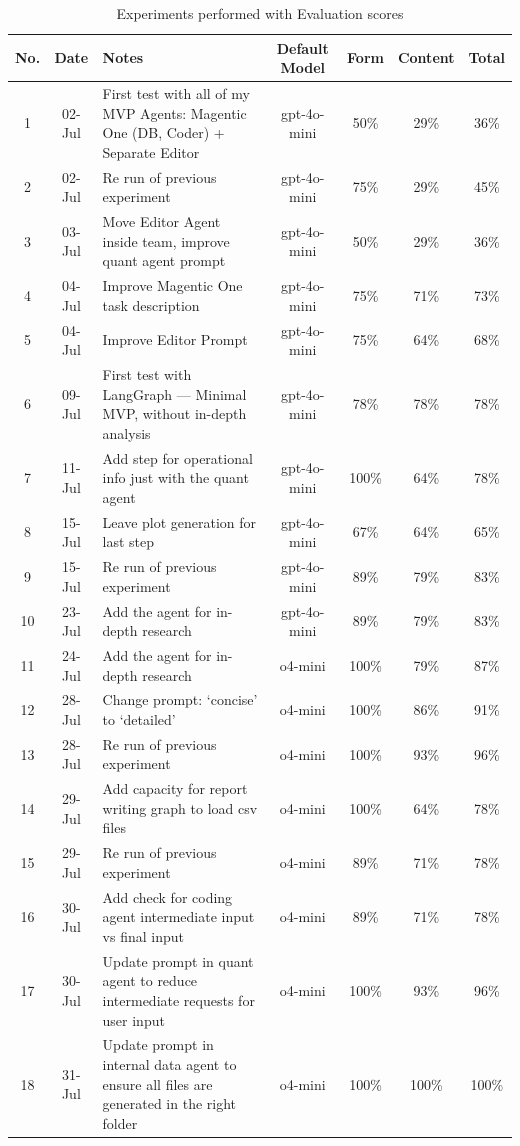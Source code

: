 \documentclass[a4paper]{report}
\begin{document}
\begin{table}[H]
\centering
\begin{tabular}{|c|c|p{7cm}|c|c|c|c|}
    \hline
    No. & Date & Notes & Default Model & Form & Content & Total \\ \hline
    1 & 02-Jul & First test with all of my MVP Agents: Magentic One (DB, Coder) + Separate Editor & gpt-4o-mini & 50\% & 29\% & 36\% \\ \hline
    2 & 02-Jul & Re run of previous experiment & gpt-4o-mini & 75\% & 29\% & 45\% \\ \hline
    3 & 03-Jul & Move Editor Agent inside team, improve quant agent prompt & gpt-4o-mini & 50\% & 29\% & 36\% \\ \hline
    4 & 04-Jul & Improve Magentic One task description & gpt-4o-mini & 75\% & 71\% & 73\% \\ \hline
    5 & 04-Jul & Improve Editor Prompt & gpt-4o-mini & 75\% & 64\% & 68\% \\ \hline
    6 & 09-Jul & First test with LangGraph --- Minimal MVP, without in-depth analysis & gpt-4o-mini & 78\% & 78\% & 78\% \\ \hline
    7 & 11-Jul & Add step for operational info just with the quant agent & gpt-4o-mini & 100\% & 64\% & 78\% \\ \hline
    8 & 15-Jul & Leave plot generation for last step & gpt-4o-mini & 67\% & 64\% & 65\% \\ \hline
    9 & 15-Jul & Re run of previous experiment  & gpt-4o-mini & 89\% & 79\% & 83\% \\ \hline
    10 & 23-Jul & Add the agent for in-depth research & gpt-4o-mini & 89\% & 79\% & 83\% \\ \hline
    11 & 24-Jul & Add the agent for in-depth research & o4-mini & 100\% & 79\% & 87\% \\ \hline
    12 & 28-Jul & Change prompt: `concise' to `detailed' & o4-mini & 100\% & 86\% & 91\% \\ \hline
    13 & 28-Jul & Re run of previous experiment & o4-mini & 100\% & 93\% & 96\% \\ \hline
    14 & 29-Jul & Add capacity for report writing graph to load csv files & o4-mini & 100\% & 64\% & 78\% \\ \hline
    15 & 29-Jul & Re run of previous experiment & o4-mini & 89\% & 71\% & 78\% \\ \hline
    16 & 30-Jul & Add check for coding agent intermediate input vs final input & o4-mini & 89\% & 71\% & 78\% \\ \hline
    17 & 30-Jul & Update prompt in quant agent to reduce intermediate requests for user input & o4-mini & 100\% & 93\% & 96\% \\ \hline
    18 & 31-Jul & Update prompt in internal data agent to ensure all files are generated in the right folder & o4-mini & 100\% & 100\% & 100\% \\ \hline
    \end{tabular}
\caption{Experiments performed with Evaluation scores}
\end{table}
\end{document}
